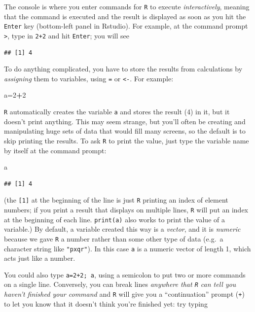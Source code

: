\documentclass[11pt,]{article}
\newenvironment{Shaded}{\begin{snugshade}}{\end{snugshade}}
\newcommand{\DecValTok}[1]{\textcolor[rgb]{0.00,0.00,0.81}{#1}}
\newcommand{\NormalTok}[1]{#1}
\newcommand{\OperatorTok}[1]{\textcolor[rgb]{0.81,0.36,0.00}{\textbf{#1}}}
\begin{document}
The console is where you enter commands for \texttt{R} to execute \emph{interactively}, meaning that the command is executed and the result is displayed as soon as you hit the \texttt{Enter} key (bottom-left panel in Rstudio). For example, at the command prompt \texttt{\textgreater{}}, type in \texttt{2+2} and hit \texttt{Enter}; you will see

\begin{verbatim}
## [1] 4
\end{verbatim}

To do anything complicated, you have to store the results from calculations by \emph{assigning} them to variables, using \texttt{=} or \texttt{\textless{}-}. For example:

\begin{Shaded}
\begin{Highlighting}[]
\NormalTok{a=}\DecValTok{2}\OperatorTok{+}\DecValTok{2}
\end{Highlighting}
\end{Shaded}

\texttt{R} automatically creates the variable \texttt{a} and stores the result (4) in it, but it doesn't print anything. This may seem strange, but you'll often be creating and manipulating huge sets of data that would fill many screens, so the default is to skip printing the results. To ask \texttt{R} to print the value, just type the variable name by itself at the command prompt:

\begin{Shaded}
\begin{Highlighting}[]
\NormalTok{a}
\end{Highlighting}
\end{Shaded}

\begin{verbatim}
## [1] 4
\end{verbatim}

(the \texttt{{[}1{]}} at the beginning of the line is just \texttt{R} printing an index of element numbers; if you print a result that displays on multiple lines, \texttt{R} will put an index at the beginning of each line. \texttt{print(a)} also works to print the value of a variable.) By default, a variable created this way is a \emph{vector}, and it is \emph{numeric} because we gave \texttt{R} a number rather than some other type of data (e.g.~a character string like \texttt{"pxqr"}). In this case \texttt{a} is a numeric vector of length 1, which acts just like a number.

You could also type \texttt{a=2+2;\ a}, using a semicolon to put two or more commands on a single line. Conversely, you can break lines \emph{anywhere that \texttt{R} can tell you haven't finished your command} and \texttt{R} will give you a ``continuation'' prompt (\texttt{+}) to let you know that it doesn't think you're finished yet: try typing
\end{document}
